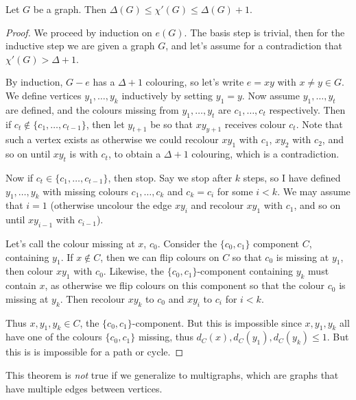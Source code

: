\begin{theorem}
	Let $G$ be a graph. Then $\Delta(G) \leq \chi'(G) \leq \Delta(G) + 1$.
\end{theorem}
\begin{proof}
	We proceed by induction on $e(G)$. The basis step is trivial, then for the inductive step we are given a graph $G$, and let's assume for a contradiction that $\chi'(G) > \Delta + 1$.

	By induction, $G - e$ has a $\Delta + 1$ colouring, so let's write $e = xy$ with $x \neq y \in G$. We define vertices $y_1, \dots, y_k$ inductively by setting $y_1 = y$. Now assume $y_1, \dots, y_t$ are defined, and the colours missing from $y_1, \dots, y_t$ are $c_1, \dots, c_t$ respectively. Then if $c_t \not \in \{c_1, \dots, c_{t - 1}\}$, then let $y_{t + 1}$ be so that $xy_{y + 1}$ receives colour $c_t$.
	Note that such a vertex exists as otherwise we could recolour $xy_1$ with $c_1$, $xy_2$  with $c_2$, and so on until $x y_t$ is with $c_t$, to obtain a $\Delta + 1$ colouring, which is a  contradiction.

	Now if $c_t \in \{c_1, \dots, c_{t - 1}\}$, then stop. Say we stop after $k$ steps, so I have defined $y_1, \dots, y_k$ with missing colours $c_1, \dots, c_k$ and $c_k = c_i$ for some $i < k$. We may assume that $i = 1$ (otherwise uncolour the edge $xy_i$ and recolour $xy_1$ with $c_1$, and so on until $xy_{i - 1}$ with $c_{i - 1}$).

	Let's call the colour missing at $x$, $c_0$. Consider the $\{c_0, c_1\}$ component $C$, containing $y_1$. If $x \not \in C$, then we can flip colours on $C$ so that $c_0$ is missing at $y_1$, then colour $xy_1$ with $c_0$. Likewise, the $\{c_0, c_1\}$-component containing $y_k$ must contain $x$, as otherwise we flip colours on this component so that the colour $c_0$ is missing at $y_k$. Then recolour $xy_k$ to $c_0$ and $xy_i$ to $c_i$ for $i < k$.

	Thus $x, y_1, y_k \in C$, the $\{c_0, c_1\}$-component. But this is impossible since $x, y_1, y_k$ all have one of the colours $\{c_0, c_1\}$ missing, thus $d_C(x), d_C(y_1), d_C(y_k) \leq 1$. But this is is impossible for a path or cycle.
\end{proof}

\begin{remark}
	This theorem is \emph{not} true if we generalize to multigraphs, which are graphs that have multiple edges between vertices.
\end{remark}

